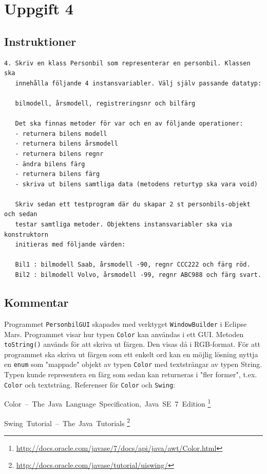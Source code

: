 \section{Uppgift 4}\label{sec:uppg04}

\subsection{Instruktioner}
\begin{verbatim}
4. Skriv en klass Personbil som representerar en personbil. Klassen ska
   innehålla följande 4 instansvariabler. Välj själv passande datatyp:

   bilmodell, årsmodell, registreringsnr och bilfärg

   Det ska finnas metoder för var och en av följande operationer:
   - returnera bilens modell
   - returnera bilens årsmodell
   - returnera bilens regnr
   - ändra bilens färg
   - returnera bilens färg
   - skriva ut bilens samtliga data (metodens returtyp ska vara void)

   Skriv sedan ett testprogram där du skapar 2 st personbils-objekt och sedan
   testar samtliga metoder. Objektens instansvariabler ska via konstruktorn
   initieras med följande värden:

   Bil1 : bilmodell Saab, årsmodell -90, regnr CCC222 och färg röd.
   Bil2 : bilmodell Volvo, årsmodell -99, regnr ABC988 och färg svart.
\end{verbatim}


\subsection{Kommentar}
Programmet \texttt{PersonbilGUI} skapades med verktyget \texttt{WindowBuilder}
i Eclipse Mars. Programmet visar hur typen \texttt{Color} kan användas i ett
GUI.  Metoden \texttt{toString()} används för att skriva ut färgen. Den visas
då i RGB-format. För att programmet ska skriva ut färgen som ett enkelt ord kan
en möjlig lösning nyttja en \texttt{enum} som "mappade" objekt av typen
\texttt{Color} med textsträngar av typen String. Typen kunde representera en
färg som sedan kan returneras i "fler former", t.ex. \texttt{Color} och
textsträng. 
Referenser för \texttt{Color} och \texttt{Swing}:

\mbox{Color -- The Java Language Specification, Java SE 7 Edition}
\footnote{\url{http://docs.oracle.com/javase/7/docs/api/java/awt/Color.html}}

\mbox{Swing Tutorial -- The Java Tutorials}
\footnote{\url{http://docs.oracle.com/javase/tutorial/uiswing/}}


